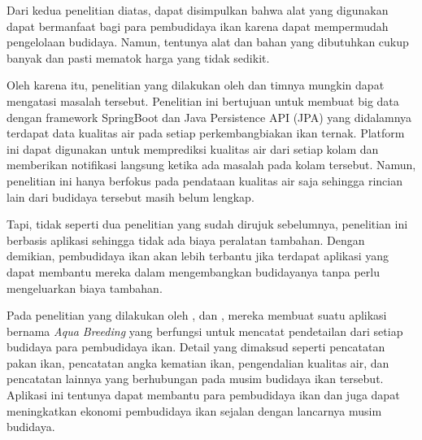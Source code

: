 Dari kedua penelitian diatas, dapat disimpulkan bahwa alat yang digunakan dapat bermanfaat bagi para pembudidaya ikan karena dapat mempermudah pengelolaan budidaya. Namun, tentunya alat dan bahan yang dibutuhkan cukup banyak dan pasti mematok harga yang tidak sedikit. 

Oleh karena itu, penelitian yang dilakukan oleh \citep{waterquality} dan timnya mungkin dapat mengatasi masalah tersebut. Penelitian ini bertujuan untuk membuat big data dengan framework SpringBoot dan Java Persistence API (JPA) yang didalamnya terdapat data kualitas air pada setiap perkembangbiakan ikan ternak. Platform ini dapat digunakan untuk memprediksi kualitas air dari setiap kolam dan memberikan notifikasi langsung ketika ada masalah pada kolam tersebut. Namun, penelitian ini hanya berfokus pada pendataan kualitas air saja sehingga rincian lain dari budidaya tersebut masih belum lengkap. \citep{waterquality} 

Tapi, tidak seperti dua penelitian yang sudah dirujuk sebelumnya, penelitian \citep{waterquality} ini berbasis aplikasi sehingga tidak ada biaya peralatan tambahan. Dengan demikian, pembudidaya ikan akan lebih terbantu jika terdapat aplikasi yang dapat membantu mereka dalam mengembangkan budidayanya tanpa perlu mengeluarkan biaya tambahan.

Pada penelitian yang dilakukan oleh \citep{fadhil2021}, \citep{gian2022} dan \citep{andri2022}, mereka membuat suatu aplikasi bernama \textit{Aqua Breeding} yang berfungsi untuk mencatat pendetailan dari setiap budidaya para pembudidaya ikan. Detail yang dimaksud seperti pencatatan pakan ikan, pencatatan angka kematian ikan, pengendalian kualitas air, dan pencatatan lainnya yang berhubungan pada musim budidaya ikan tersebut. Aplikasi ini tentunya dapat membantu para pembudidaya ikan dan juga dapat meningkatkan ekonomi pembudidaya ikan sejalan dengan lancarnya musim budidaya.

